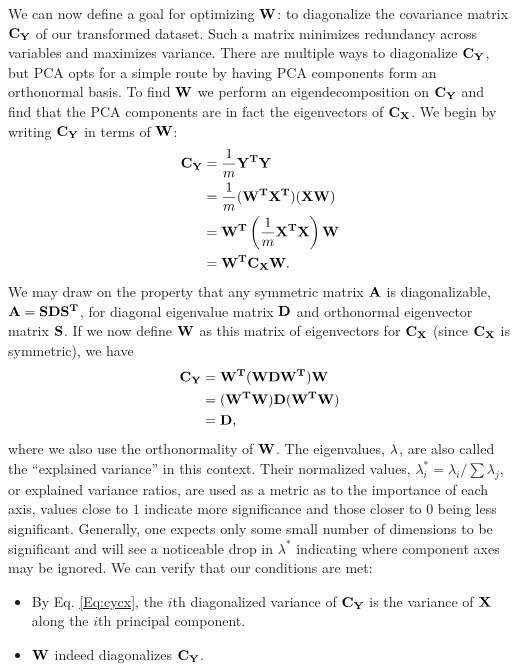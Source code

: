 We can now define a goal for optimizing $\mathbf{W}$: to diagonalize the covariance matrix $\mathbf{C_Y}$ of our transformed dataset. Such a matrix minimizes redundancy across variables and maximizes variance. There are multiple ways to diagonalize $\mathbf{C_Y}$, but PCA opts for a simple route by having PCA components form an orthonormal basis. 
To find $\mathbf{W}$ we perform an eigendecomposition on $\mathbf{C_Y}$ and find that the PCA components are in fact the eigenvectors of $\mathbf{C_X}$. We begin by writing $\mathbf{C_Y}$ in terms of $\mathbf{W}$:
\begin{align}
\nonumber	\mathbf{C_Y} &= \frac{1}{m}\mathbf{Y^TY}\\
\nonumber	&= \frac{1}{m}(\mathbf{W^TX^T})(\mathbf{XW})\\
\nonumber	&= \mathbf{W^T}\left(\frac{1}{m}\mathbf{X^TX}\right)\mathbf{W}\\
	&= \mathbf{W^TC_XW}.
\label{Eq:cycx}
\end{align}
We may draw on the property that any symmetric matrix $\mathbf{A}$ is diagonalizable, $\mathbf{A}=\mathbf{SDS^T}$, for diagonal eigenvalue matrix $\mathbf{D}$ and orthonormal eigenvector matrix $\mathbf{S}$. If we now define $\mathbf{W}$ as this matrix of eigenvectors for $\mathbf{C_X}$ (since $\mathbf{C_X}$ is symmetric), we have
\begin{align*}
	\mathbf{C_Y} &= \mathbf{W^T}(\mathbf{WDW^T})\mathbf{W}\\
	&= (\mathbf{W^TW})\mathbf{D}(\mathbf{W^TW})\\
	&= \mathbf{D},
\end{align*}
where we also use the orthonormality of $\mathbf{W}$. The eigenvalues, $\mathbf{\lambda}$, are also called the ``explained variance'' in this context. Their normalized values, $\lambda_i^* = \lambda_i/\sum\lambda_j$, or explained variance ratios, are used as a metric as to the importance of each axis, values close to $1$ indicate more significance and those closer to $0$ being less significant. Generally, one expects only some small number of dimensions to be significant and will see a noticeable drop in $\lambda^*$ indicating where component axes may be ignored.
We can verify that our conditions are met:
\begin{itemize}
	\item By Eq. \ref{Eq:cycx}, the $i$th diagonalized variance of $\mathbf{C_Y}$ is the variance of $\mathbf{X}$ along the $i$th principal component.
	\item $\mathbf{W}$ indeed diagonalizes $\mathbf{C_Y}$.
\end{itemize}


